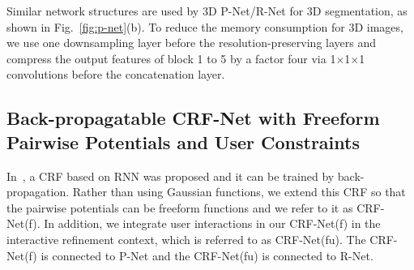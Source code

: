 \documentclass[10pt,journal,compsoc]{IEEEtran}
\begin{document}
Similar network structures are used by 3D P-Net/R-Net for 3D segmentation, as shown in Fig.~\ref{fig:p-net}(b). To reduce the memory consumption for 3D images, we use one downsampling layer before the resolution-preserving layers and compress the output features of block 1 to 5 by a factor four via 1$\times$1$\times$1 convolutions before the concatenation layer. 

\subsection{Back-propagatable CRF-Net with Freeform Pairwise Potentials and User Constraints}\label{method:crf}
In~\cite{Zheng2015a}, a CRF based on RNN was proposed and it can be trained by back-propagation. Rather than using Gaussian functions, we extend this CRF so that the pairwise potentials can be freeform functions and we refer to it as CRF-Net(f). In addition, we integrate user interactions in our CRF-Net(f) in the interactive refinement context, which is referred to as CRF-Net(fu). The CRF-Net(f) is connected to P-Net and the CRF-Net(fu) is connected to R-Net.
\end{document}
